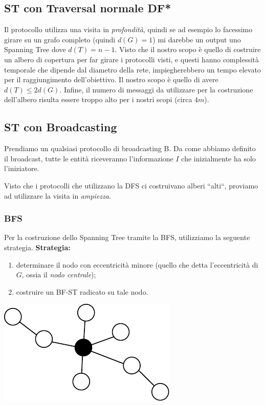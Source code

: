 \subsection{ST con Traversal normale DF*}
Il protocollo utilizza una visita in \textit{profondità}, quindi se ad esempio lo facessimo girare su un grafo completo (quindi $d(G)=1$) mi darebbe un output uno Spanning Tree dove $d(T) = n-1$. Visto che il nostro scopo è quello di costruire un albero di copertura per far girare i protocolli visti, e questi hanno complessità temporale che dipende dal diametro della rete, impiegherebbero un tempo elevato per il raggiungimento dell'obiettivo. Il nostro scopo è quello di avere $d(T) \leq 2d(G)$. Infine, il numero di messaggi da utilizzare per la costruzione dell'albero risulta essere troppo alto per i nostri scopi (circa $4m$).

\subsection{ST con Broadcasting}
Prendiamo un qualsiasi protocollo di broadcasting B. Da come abbiamo definito il broadcast, tutte le entità riceveranno l'informazione $I$ che inizialmente ha solo l'iniziatore.


Visto che i protocolli che utilizzano la DFS ci costruivano alberi ``alti``, proviamo ad utilizzare la visita in \textit{ampiezza}.

\subsubsection{BFS}
Per la costruzione dello Spanning Tree tramite la BFS, utilizziamo la seguente strategia.
\textbf{Strategia:}
\begin{enumerate}
  \item determinare il nodo con eccentricità minore (quello che detta l'eccentricità di $G$, ossia il \textit{nodo centrale});
  \item costruire un BF-ST radicato su tale nodo.
\end{enumerate}

\begin{center}
  \includegraphics[scale=1]{images/n_24}
\end{center}

